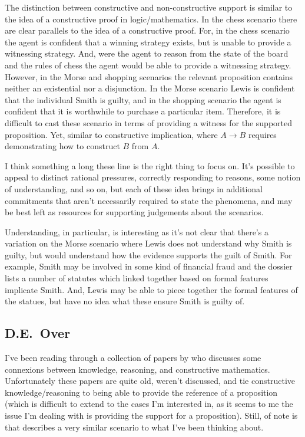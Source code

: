\documentclass[10pt]{article}
\begin{document}
The distinction between constructive and non-constructive support is similar to the idea of a constructive proof in logic/mathematics.
In the chess scenario there are clear parallels to the idea of a constructive proof.
For, in the chess scenario the agent is confident that a winning strategy exists, but is unable to provide a witnessing strategy.
And, were the agent to reason from the state of the board and the rules of chess the agent would be able to provide a witnessing strategy.
However, in the Morse and shopping scenarios the relevant proposition contains neither an existential nor a disjunction.
In the Morse scenario Lewis is confident that the individual Smith is guilty, and in the shopping scenario the agent is confident that it is worthwhile to purchase a particular item.
Therefore, it is difficult to cast these scenario in terms of providing a witness for the supported proposition.
Yet, similar to constructive implication, where \(A \rightarrow B\) requires demonstrating how to construct \(B\) from \(A\).

\begin{note}
  I think something a long these line is the right thing to focus on.
  It's possible to appeal to distinct rational pressures, correctly responding to reasons, some notion of understanding, and so on, but each of these idea brings in additional commitments that aren't necessarily required to state the phenomena, and may be best left as resources for supporting judgements about the scenarios.

  Understanding, in particular, is interesting as it's not clear that there's a variation on the Morse scenario where Lewis does not understand why Smith is guilty, but would understand how the evidence supports the guilt of Smith.
  For example, Smith may be involved in some kind of financial fraud and the dossier lists a number of statutes which linked together based on formal features implicate Smith.
  And, Lewis may be able to piece together the formal features of the statues, but have no idea what these ensure Smith is guilty of.
\end{note}

\subsection{D.E.\ Over}
\label{sec:d.e.-over}

I've been reading through a collection of papers by \citeauthor{Over:1983ab} who discusses some connexions between knowledge, reasoning, and constructive mathematics.
Unfortunately these papers are quite old, weren't discussed, and tie constructive knowledge/reasoning to being able to provide the reference of a proposition (which is difficult to extend to the cases I'm interested in, as it seems to me the issue I'm dealing with is providing the support for a proposition).
Still, of note is that \citeauthor{Over:1983ab} describes a very similar scenario to what I've been thinking about.
\end{document}
